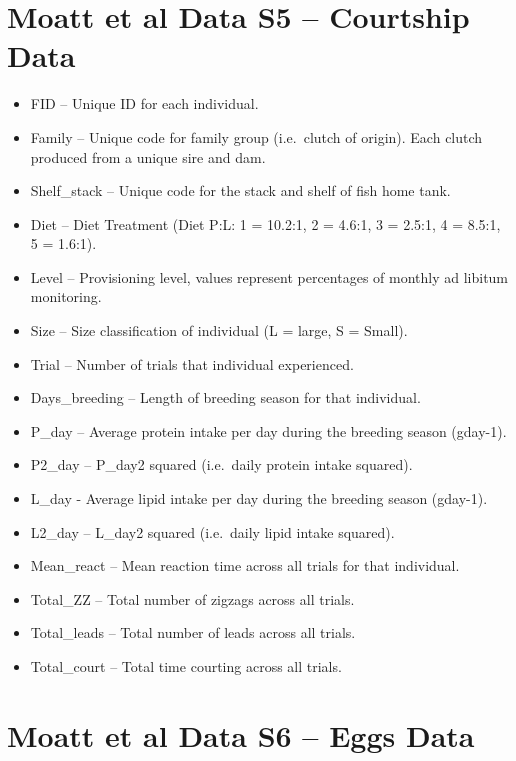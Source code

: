 \documentclass[]{book}
\providecommand{\tightlist}{%
  \setlength{\itemsep}{0pt}\setlength{\parskip}{0pt}}
\begin{document}
\hypertarget{moatt-et-al-data-s5-courtship-data}{%
\section{Moatt et al Data S5 -- Courtship Data}\label{moatt-et-al-data-s5-courtship-data}}

\begin{itemize}
\tightlist
\item
  FID -- Unique ID for each individual.
\item
  Family -- Unique code for family group (i.e.~clutch of origin). Each clutch produced from a unique sire and dam.
\item
  Shelf\_stack -- Unique code for the stack and shelf of fish home tank.
\item
  Diet -- Diet Treatment (Diet P:L: 1 = 10.2:1, 2 = 4.6:1, 3 = 2.5:1, 4 = 8.5:1, 5 = 1.6:1).
\item
  Level -- Provisioning level, values represent percentages of monthly ad libitum monitoring.
\item
  Size -- Size classification of individual (L = large, S = Small).
\item
  Trial -- Number of trials that individual experienced.
\item
  Days\_breeding -- Length of breeding season for that individual.
\item
  P\_day -- Average protein intake per day during the breeding season (gday-1).
\item
  P2\_day -- P\_day2 squared (i.e.~daily protein intake squared).
\item
  L\_day - Average lipid intake per day during the breeding season (gday-1).
\item
  L2\_day -- L\_day2 squared (i.e.~daily lipid intake squared).
\item
  Mean\_react -- Mean reaction time across all trials for that individual.
\item
  Total\_ZZ -- Total number of zigzags across all trials.
\item
  Total\_leads -- Total number of leads across all trials.
\item
  Total\_court -- Total time courting across all trials.
\end{itemize}

\hypertarget{moatt-et-al-data-s6-eggs-data}{%
\section{Moatt et al Data S6 -- Eggs Data}\label{moatt-et-al-data-s6-eggs-data}}
\end{document}

